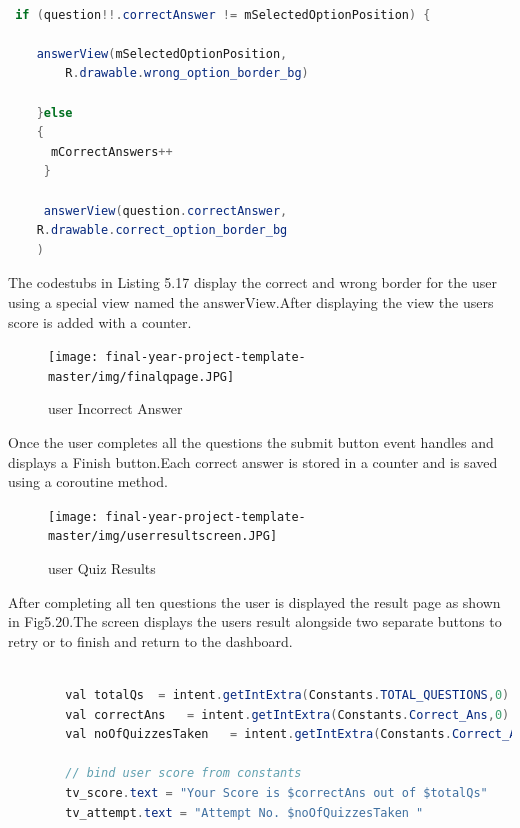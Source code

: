 \begin{lstlisting}[language=Java, caption= Incorrect Answer border ]

 if (question!!.correctAnswer != mSelectedOptionPosition) {

    answerView(mSelectedOptionPosition,
        R.drawable.wrong_option_border_bg)
                    
    }else
    {
      mCorrectAnswers++
     }

     answerView(question.correctAnswer,
    R.drawable.correct_option_border_bg
    )


\end{lstlisting}

The codestubs in Listing 5.17 display the correct and wrong border for the user using a special view named the answerView.After displaying the view the users score is added with a counter.

 \begin{figure}[H]
  \centering
    \texttt{[image: final-year-project-template-master/img/finalqpage.JPG]}
     \caption{user Incorrect Answer}
\end{figure}
Once the user completes all the questions the submit button event handles and displays a Finish button.Each correct answer is stored in a counter and is saved using a coroutine method.




 \begin{figure}[H]
  \centering
    \texttt{[image: final-year-project-template-master/img/userresultscreen.JPG]}
     \caption{user Quiz Results}
\end{figure}
After completing all ten questions the user is displayed the result page as shown in Fig5.20.The screen displays the users result alongside two separate buttons to retry or to finish and return to the dashboard.




\begin{lstlisting}[language=Java, caption= Incorrect Answer border ]

        val totalQs  = intent.getIntExtra(Constants.TOTAL_QUESTIONS,0)
        val correctAns   = intent.getIntExtra(Constants.Correct_Ans,0)
        val noOfQuizzesTaken   = intent.getIntExtra(Constants.Correct_Ans,0)

        // bind user score from constants
        tv_score.text = "Your Score is $correctAns out of $totalQs"
        tv_attempt.text = "Attempt No. $noOfQuizzesTaken "
\end{lstlisting}


